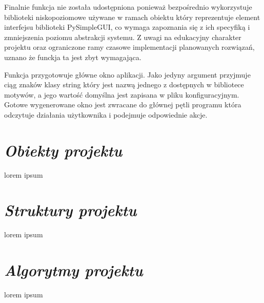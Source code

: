 \documentclass[a4paper,10pt, twoside]{report}
\newcommand{\customstylesection}[1]{\textbf{\textit{#1}}}
\begin{document}
{Finalnie funkcja nie została udostępniona ponieważ bezpośrednio wykorzystuje 
biblioteki niskopoziomowe używane w ramach obiektu który reprezentuje element 
interfejsu biblioteki PySimpleGUI, co wymaga zapoznania się z ich specyfiką i 
zmniejszenia poziomu abstrakcji systemu. Z uwagi na edukacyjny charakter 
projektu oraz ograniczone ramy czasowe implementacji planowanych rozwiązań, 
uznano że funckja ta jest zbyt wymagająca.}

\medskip
{Funkcja  przygotowuje główne okno 
aplikacji. Jako jedyny argument  przyjmuje ciąg znaków klasy 
string który jest nazwą jednego z dostępnych w bibliotece motywów, a jego 
wartość domyślna jest zapisana w pliku konfiguracyjnym. Gotowe wygenerowane okno
 jest zwracane do głównej pętli programu która odczytuje działania użytkownika i
 podejmuje odpowiednie akcje.}

\section{\customstylesection{Obiekty projektu}}
{lorem ipsum}

\section{\customstylesection{Struktury projektu}}
{lorem ipsum}

\section{\customstylesection{Algorytmy projektu}}
{lorem ipsum}
\end{document}
